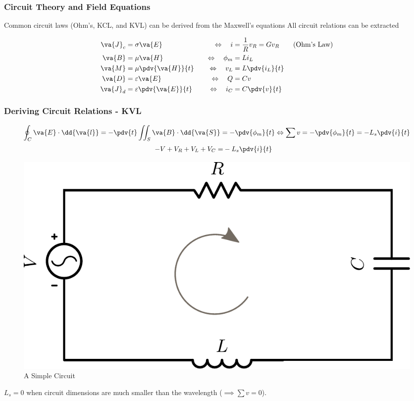 \documentclass[10pt, compress]{beamer}
\newcommand{\E}{\varepsilon}  %
\renewcommand{\u}{\mu}  %
\begin{document}
\begin{frame}
\frametitle{Circuit Theory and Field Equations}
\begin{outline}
  \1 Common circuit laws (Ohm's, KCL, and KVL) can be derived from the Maxwell's equations
  \1 All circuit relations can be extracted
\end{outline}
\begin{align*}
  \va{J}_c &=\sigma \va{E} &\quad \Leftrightarrow \quad i &=\frac{1}{R} v_{R} = G v_{R} \tag{Ohm's Law} \\
\va{B} & = \u \va{H} &\quad \Leftrightarrow \quad \phi_{m} &= L i_{L} \\
\va{M} &= \u \pdv{\va{H}}{t} &\quad \Leftrightarrow \quad v_{L}&= L \pdv{i_L}{t} \\
\va{D} &= \E \va{E} &\quad \Leftrightarrow \quad  Q &= C v \\
\va{J}_d &= \E \pdv{\va{E}}{t} &\quad \Leftrightarrow \quad i_{C} &= C \pdv{v}{t}
\end{align*}
\end{frame}
\begin{frame}
  \frametitle{Deriving Circuit Relations - KVL}
      \begin{align*}
      \oint_{C} \va{E} \cdot \dd{\va{l}} =- \pdv{t} \iint_{S} \va{B} \cdot \dd{\va{S}} =-\pdv{\phi_m}{t} \Leftrightarrow \sum v = -\pdv{\phi_m}{t} = -L_{s} \pdv{i}{t}
    \end{align*}
    \begin{align*}
      -V + V_R + V_L + V_C  =& -L_{s} \pdv{i}{t}
    \end{align*}
    \begin{figure}
            \centering
          \includegraphics[width=.4\textwidth]{circuit.pdf}
      \caption{A Simple Circuit}
    \end{figure}
    \begin{outline}
      \1 $L_s = 0$ when circuit dimensions are much smaller than the wavelength ($\implies \sum v = 0$).
    \end{outline}
\end{frame}
\end{document}
